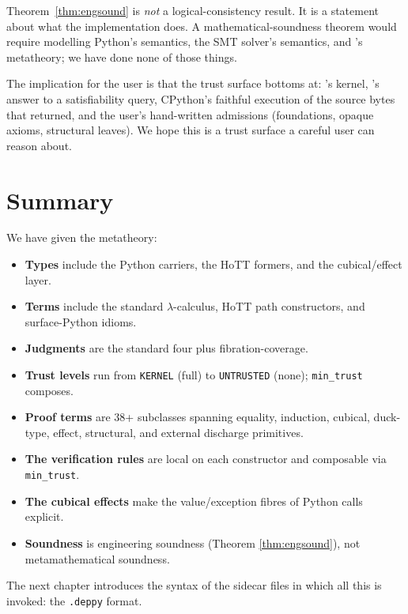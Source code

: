 \begin{remark}
Theorem~\ref{thm:engsound} is \emph{not} a logical-consistency
result.  It is a statement about what the implementation does.  A
mathematical-soundness theorem would require modelling Python's
semantics, the SMT solver's semantics, and \Lean's metatheory; we
have done none of those things.

The implication for the user is that the trust surface bottoms at:
\Lean's kernel, \Zthree{}'s answer to a satisfiability query,
CPython's faithful execution of the source bytes that
\Inspect{} returned, and the user's hand-written admissions
(foundations, opaque axioms, structural leaves).  We hope this is a
trust surface a careful user can reason about.
\end{remark}

\section{Summary}
\label{sec:ch4-summary}

We have given the metatheory:
\begin{itemize}[leftmargin=1.7em]
  \item \textbf{Types} include the Python carriers, the HoTT formers,
    and the cubical/effect layer.
  \item \textbf{Terms} include the standard $\lambda$-calculus,
    HoTT path constructors, and surface-Python idioms.
  \item \textbf{Judgments} are the standard four plus
    fibration-coverage.
  \item \textbf{Trust levels} run from \texttt{KERNEL} (full) to
    \texttt{UNTRUSTED} (none); \texttt{min\_trust} composes.
  \item \textbf{Proof terms} are 38+ subclasses spanning equality,
    induction, cubical, duck-type, effect, structural, and external
    discharge primitives.
  \item \textbf{The verification rules} are local on each constructor
    and composable via \texttt{min\_trust}.
  \item \textbf{The cubical effects} make the value/exception
    fibres of Python calls explicit.
  \item \textbf{Soundness} is engineering soundness (Theorem
    \ref{thm:engsound}), not metamathematical soundness.
\end{itemize}

The next chapter introduces the syntax of the sidecar files in which
all this is invoked: the \texttt{.deppy} format.
